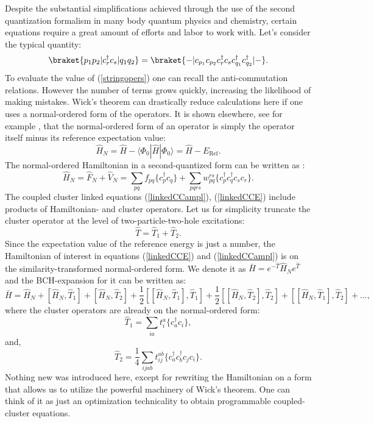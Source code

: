 \documentclass[twoside,english]{uiofysmaster}
\begin{document}
Despite the substantial simplifications achieved through the use of the second quantization formalism in many body quantum physics and chemistry, certain equations require a great amount of efforts and labor to work with. Let's consider the typical quantity:
\begin{equation}\label{stringopers}
\braket{p_1 p_2|c_r^\dag c_s|q_1 q_2} = \braket{-|c_{p_1} c_{p_2} c_r^\dag c_s c_{q_1}^\dag c_{q_2}^\dag|-}.
\end{equation}
To evaluate the value of (\ref{stringopers}) one can recall the
anti-commutation relations. However the number of terms grows quickly,
increasing the likelihood of making mistakes.  Wick's theorem can
drastically reduce calculations here if one uses a normal-ordered form
of the operators. It is shown
elsewhere, see for example \cite{CrawfordIntroductionCoupledCluster2007}, that the
normal-ordered form of an operator is simply the operator itself minus
its reference expectation value:
\[
\hat{H}_N = \hat{H} - \langle\Phi_0 |\hat{H} |\Phi_0\rangle = \hat{H} - E_{\text{Ref}}.
\]
The normal-ordered Hamiltonian in a second-quantized form can be written as \cite{HarrisAlgebraicdiagrammaticmethods1992}:
\begin{equation}\label{NOHAM}
\hat{H}_N = \hat{F}_N + \hat{V}_N  = \sum_{pq} f_{pq} \{c^\dagger_pc_q\} + \sum_{pqrs} w_{pq}^{rs} \{c^\dagger_pc^\dag_qc_sc_r\}.
\end{equation}
The coupled cluster linked equations (\ref{linkedCCampl}), (\ref{linkedCCE}) include products of Hamiltonian- and cluster operators. Let us for simplicity truncate the cluster operator at the level of two-particle-two-hole excitations:
\[
\hat{T} = \hat{T}_1 + \hat{T}_2.
\]
Since the expectation value of the reference energy is just a number, the Hamiltonian of interest in equations (\ref{linkedCCE}) and (\ref{linkedCCampl}) is on the similarity-transformed normal-ordered form. We denote it as $\bar{H} = e^{-\hat{T}}\hat{H}_Ne^{\hat{T}}$ and the BCH-expansion for it can be written as:
\begin{equation}
\bar{H} = \hat{H}_N + [\hat{H}_N,\hat{T}_1] + [\hat{H}_N,\hat{T}_2] +\frac{1}{2}[[\hat{H}_N,\hat{T}_1],\hat{T}_1] + \frac{1}{2}[[\hat{H}_N,\hat{T}_2],\hat{T}_2] +  [[\hat{H}_N,\hat{T}_1],\hat{T}_2] + \dots ,
\end{equation}\label{HAILT1}
where the cluster operators are already on the normal-ordered form:
\[ 
\hat{T}_1 = \sum_{ia}t_{i}^{a}\{ c^\dag_{a} c_{i}\},
\]
and,
\[ 
\hat{T}_2 = \frac{1}{4}\sum_{ijab}t_{ij}^{ab} \{ c^\dag_{a} c^\dag_{b} c_{j} c_{i} \}.
\]
Nothing new was introduced here, except for rewriting the Hamiltonian
on a form that allows us to utilize the powerful machinery of Wick's
theorem. One can think of it as just an optimization technicality to
obtain programmable coupled-cluster equations.
\end{document}
